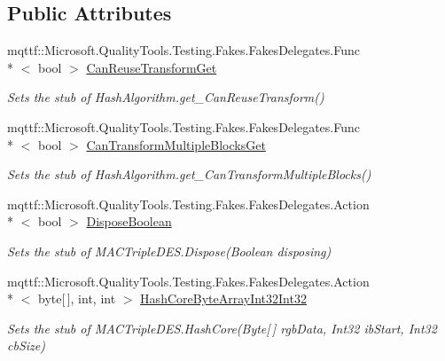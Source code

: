 \subsection*{Public Attributes}
\begin{DoxyCompactItemize}
\item 
mqttf\-::\-Microsoft.\-Quality\-Tools.\-Testing.\-Fakes.\-Fakes\-Delegates.\-Func\\*
$<$ bool $>$ \hyperlink{class_system_1_1_security_1_1_cryptography_1_1_fakes_1_1_stub_m_a_c_triple_d_e_s_a7f6001b6b4549b37bf05e9245f0e5384}{Can\-Reuse\-Transform\-Get}
\begin{DoxyCompactList}\small\item\em Sets the stub of Hash\-Algorithm.\-get\-\_\-\-Can\-Reuse\-Transform()\end{DoxyCompactList}\item 
mqttf\-::\-Microsoft.\-Quality\-Tools.\-Testing.\-Fakes.\-Fakes\-Delegates.\-Func\\*
$<$ bool $>$ \hyperlink{class_system_1_1_security_1_1_cryptography_1_1_fakes_1_1_stub_m_a_c_triple_d_e_s_ab40277eb2846d1c444954959f479b040}{Can\-Transform\-Multiple\-Blocks\-Get}
\begin{DoxyCompactList}\small\item\em Sets the stub of Hash\-Algorithm.\-get\-\_\-\-Can\-Transform\-Multiple\-Blocks()\end{DoxyCompactList}\item 
mqttf\-::\-Microsoft.\-Quality\-Tools.\-Testing.\-Fakes.\-Fakes\-Delegates.\-Action\\*
$<$ bool $>$ \hyperlink{class_system_1_1_security_1_1_cryptography_1_1_fakes_1_1_stub_m_a_c_triple_d_e_s_affc9addd80af94e1db91c0d9feca781e}{Dispose\-Boolean}
\begin{DoxyCompactList}\small\item\em Sets the stub of M\-A\-C\-Triple\-D\-E\-S.\-Dispose(\-Boolean disposing)\end{DoxyCompactList}\item 
mqttf\-::\-Microsoft.\-Quality\-Tools.\-Testing.\-Fakes.\-Fakes\-Delegates.\-Action\\*
$<$ byte\mbox{[}$\,$\mbox{]}, int, int $>$ \hyperlink{class_system_1_1_security_1_1_cryptography_1_1_fakes_1_1_stub_m_a_c_triple_d_e_s_a2ad3d852f03e8ead97db1395e2211e33}{Hash\-Core\-Byte\-Array\-Int32\-Int32}
\begin{DoxyCompactList}\small\item\em Sets the stub of M\-A\-C\-Triple\-D\-E\-S.\-Hash\-Core(\-Byte\mbox{[}$\,$\mbox{]} rgb\-Data, Int32 ib\-Start, Int32 cb\-Size)\end{DoxyCompactList}\item 

\end{DoxyCompactItemize}
